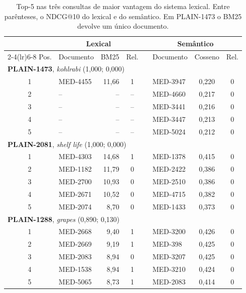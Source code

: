 \documentclass[11pt,a4paper]{article}
\begin{document}
\begin{table}[!htb]
\centering\footnotesize
\setlength{\tabcolsep}{5pt}
\caption{Top-5 nas três consultas de maior vantagem do sistema lexical. Entre parênteses, o NDCG@10 do lexical e do semântico. Em PLAIN-1473 o BM25 devolve um único documento.}
\label{tab:top5lex}
\begin{tabular*}{0.92\linewidth}{@{\extracolsep{\fill}}clrcclcc}
\toprule
 & \multicolumn{3}{c}{Lexical} & & \multicolumn{3}{c}{Semântico} \\
\cmidrule(lr){2-4}\cmidrule(lr){6-8}
Pos. & Documento & BM25 & Rel. & & Documento & Cosseno & Rel. \\
\midrule
\multicolumn{8}{l}{\textbf{PLAIN-1473}, \emph{kohlrabi} (1,000; 0,000)} \\
1 & MED-4455 & 11,66 & 1 & & MED-3947 & 0,220 & 0 \\
2 & -- & -- & -- & & MED-4660 & 0,217 & 0 \\
3 & -- & -- & -- & & MED-3441 & 0,216 & 0 \\
4 & -- & -- & -- & & MED-3447 & 0,213 & 0 \\
5 & -- & -- & -- & & MED-5024 & 0,212 & 0 \\
\midrule
\multicolumn{8}{l}{\textbf{PLAIN-2081}, \emph{shelf life} (1,000; 0,000)} \\
1 & MED-4303 & 14,68 & 1 & & MED-1378 & 0,415 & 0 \\
2 & MED-1182 & 11,79 & 0 & & MED-2422 & 0,386 & 0 \\
3 & MED-2700 & 10,93 & 0 & & MED-2510 & 0,386 & 0 \\
4 & MED-2671 & 10,52 & 0 & & MED-4715 & 0,382 & 0 \\
5 & MED-2074 & 8,70 & 0 & & MED-1433 & 0,373 & 0 \\
\midrule
\multicolumn{8}{l}{\textbf{PLAIN-1288}, \emph{grapes} (0,890; 0,130)} \\
1 & MED-2668 & 9,40 & 1 & & MED-3200 & 0,426 & 0 \\
2 & MED-2669 & 9,19 & 1 & & MED-398 & 0,425 & 0 \\
3 & MED-2083 & 8,94 & 0 & & MED-3207 & 0,425 & 0 \\
4 & MED-1538 & 8,94 & 1 & & MED-3210 & 0,424 & 0 \\
5 & MED-5065 & 8,73 & 1 & & MED-2083 & 0,414 & 0 \\
\bottomrule
\end{tabular*}
\end{table}
\end{document}
